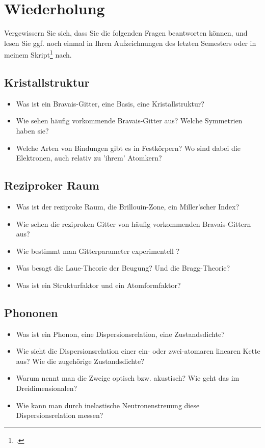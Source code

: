 \section{Wiederholung}

Vergewissern Sie sich, dass Sie die folgenden Fragen beantworten können, und lesen Sie ggf. noch einmal in Ihren Aufzeichnungen des letzten Semesters oder in meinem Skript\footcite{lippitz_epc1} nach.


\subsection*{Kristallstruktur}
 
\begin{itemize}\setlength{\itemsep}{0pt}
    \item Was ist ein Bravais-Gitter, eine Basis, eine Kristallstruktur?
    \item Wie sehen häufig vorkommende Bravais-Gitter aus? Welche Symmetrien haben sie?
    \item Welche Arten von Bindungen gibt es in Festkörpern? Wo sind dabei die Elektronen, auch relativ zu 'ihrem' Atomkern?
\end{itemize}


\subsection*{Reziproker Raum}

\begin{itemize}\setlength{\itemsep}{0pt}
    \item Was ist der reziproke Raum, die Brillouin-Zone, ein Miller'scher Index?
    \item Wie sehen die reziproken Gitter von häufig vorkommenden Bravais-Gittern aus?
    \item Wie bestimmt man Gitterparameter experimentell ?
    \item Was besagt die Laue-Theorie der Beugung? Und die Bragg-Theorie?
    \item Was ist ein Strukturfaktor und ein Atomformfaktor?
\end{itemize}

\subsection*{Phononen}

\begin{itemize}\setlength{\itemsep}{0pt}
    \item Was ist ein Phonon, eine Dispersionsrelation, eine Zustandsdichte?
    \item Wie sieht die Dispersionsrelation einer ein- oder zwei-atomaren linearen Kette aus? Wie die zugehörige Zustandsdichte?
    \item Warum nennt man die Zweige optisch bzw. akustisch? Wie geht das im Dreidimensionalen?
    \item Wie kann man durch inelastische Neutronenstreuung diese Dispersionsrelation messen?
\end{itemize}


